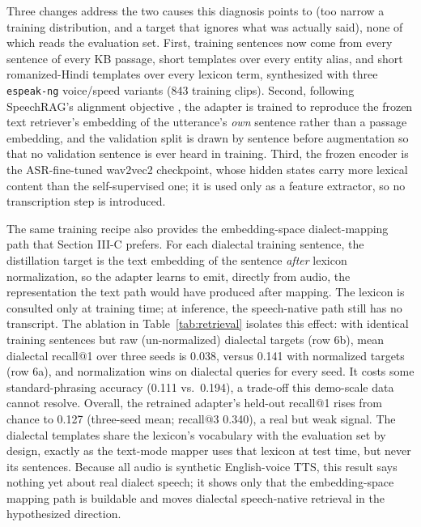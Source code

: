 \documentclass[conference]{IEEEtran}
\begin{document}
Three changes address the two causes this diagnosis points to (too narrow a training distribution, and a target that ignores what was actually said), none of which reads the evaluation set. First, training sentences now come from every sentence of every KB passage, short templates over every entity alias, and short romanized-Hindi templates over every lexicon term, synthesized with three \texttt{espeak-ng} voice/speed variants (843 training clips). Second, following SpeechRAG's alignment objective \cite{min2025speechrag}, the adapter is trained to reproduce the frozen text retriever's embedding of the utterance's \emph{own} sentence rather than a passage embedding, and the validation split is drawn by sentence before augmentation so that no validation sentence is ever heard in training. Third, the frozen encoder is the ASR-fine-tuned wav2vec2 checkpoint, whose hidden states carry more lexical content than the self-supervised one; it is used only as a feature extractor, so no transcription step is introduced.

The same training recipe also provides the embedding-space dialect-mapping path that Section III-C prefers. For each dialectal training sentence, the distillation target is the text embedding of the sentence \emph{after} lexicon normalization, so the adapter learns to emit, directly from audio, the representation the text path would have produced after mapping. The lexicon is consulted only at training time; at inference, the speech-native path still has no transcript. The ablation in Table~\ref{tab:retrieval} isolates this effect: with identical training sentences but raw (un-normalized) dialectal targets (row 6b), mean dialectal recall@1 over three seeds is 0.038, versus 0.141 with normalized targets (row 6a), and normalization wins on dialectal queries for every seed. It costs some standard-phrasing accuracy (0.111 vs.\ 0.194), a trade-off this demo-scale data cannot resolve. Overall, the retrained adapter's held-out recall@1 rises from chance to 0.127 (three-seed mean; recall@3 0.340), a real but weak signal. The dialectal templates share the lexicon's vocabulary with the evaluation set by design, exactly as the text-mode mapper uses that lexicon at test time, but never its sentences. Because all audio is synthetic English-voice TTS, this result says nothing yet about real dialect speech; it shows only that the embedding-space mapping path is buildable and moves dialectal speech-native retrieval in the hypothesized direction.
\end{document}
